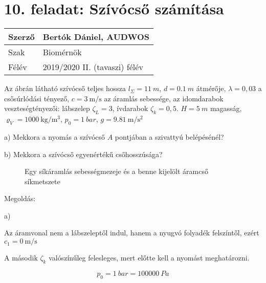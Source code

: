 \section*{10. feladat: Szívócső számítása}




\begin{tabular}{ | p{2cm} | p{14cm} | } 
	\hline
	Szerző & Bertók Dániel, AUDWOS \\ 
	\hline
	Szak & Biomérnök \\ 
	\hline
	Félév & 2019/2020 II. (tavaszi) félév \\ 
	\hline
\end{tabular}
\vspace{0.5cm}


\noindent Az ábrán látható szívócső teljes hossza $l_\Sigma= \SI{11}{m}$,
$d= \SI{0,1}{m}$ átmérője,
$\lambda= 0,03$ a csősúrlódási tényező,
$c= \SI{3}{\meter\per\second}$ az áramlás sebessége,
az idomdarabok veszteségtényezői:
lábszelep $\zeta_L= 3$, ívdarabok $\zeta_k= 0,5$.
$H= \SI{5}{m}$ magasság,
$\varrho_V= \SI{1000}{\kilogram\per\meter\cubed}$,
$p_0= \SI{1}{bar}$,
$g= \SI{9,81}{\meter\per\second\squared}$ 


\noindent a) Mekkora a nyomás a szívócső $A$ pontjában a szivattyú belépésénél?

\noindent b) Mekkora a szívócső egyenértékű csőhosszúsága?


\begin{figure}[!ht]
	\centering
	\label{figure:sm}
	\caption{Egy síkáramlás sebességmezeje és a benne kijelölt áramcső síkmetszete}
\end{figure}

\noindent\hrulefill


\noindent Megoldás:

\noindent a)

\noindent Az áramvonal nem a lábszeleptől indul, hanem a nyugvó folyadék felszíntől, ezért $c_1= \SI{0}{\meter\per\second}$

\noindent A második  $\zeta_k$ valószínűleg felesleges, mert előtte kell a nyomást meghatározni.

\begin{equation}
p_0=\SI{1}{bar}=\SI{100000}{Pa}
\end{equation}

